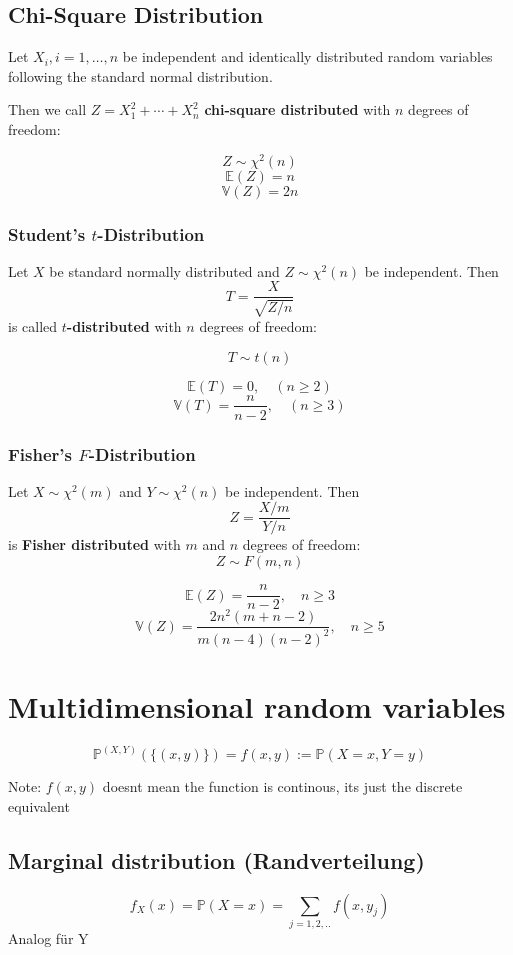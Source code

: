 \documentclass{article}
\begin{document}
\subsection{Chi-Square Distribution}
Let $X_i, i = 1,\ldots,n$ be independent and identically distributed random variables following the standard normal distribution.

Then we call $Z = X_1^2 + \cdots + X_n^2$ \textbf{chi-square distributed} with $n$ degrees of freedom:

\[Z \sim \chi^2(n)\]
\[\mathbb{E}(Z) = n\]
\[\mathbb{V}(Z) = 2n\]


\subsubsection{Student's $t$-Distribution}
Let $X$ be standard normally distributed and $Z \sim \chi^2(n)$ be independent. Then
\[T = \frac{X}{\sqrt{Z/n}}\] 
is called \textbf{$t$-distributed} with $n$ degrees of freedom:

\[T \sim t(n)\]

\[\mathbb{E}(T) = 0, \quad (n \geq 2)\]
\[\mathbb{V}(T) = \frac{n}{n-2}, \quad (n \geq 3)\]


\subsubsection{Fisher's $F$-Distribution}

Let $X \sim \chi^2(m)$ and $Y \sim \chi^2(n)$ be independent. Then
\[Z = \frac{X/m}{Y/n}\] 
is \textbf{Fisher distributed} with $m$ and $n$ degrees of freedom:
\[Z \sim F(m,n)\]

\[\mathbb{E}(Z) = \frac{n}{n-2}, \quad n \geq 3\]
\[\mathbb{V}(Z) = \frac{2n^2(m+n-2)}{m(n-4)(n-2)^2}, \quad n \geq 5\]

\section{Multidimensional random variables}

\[\mathbb{P}^{(X,Y)}(\{(x,y)\}) = f(x,y) := \mathbb{P}(X = x, Y = y)\]

Note: $f(x,y)$ doesnt mean the function is continous, its just the discrete equivalent
\subsection{Marginal distribution (Randverteilung)}

\[f_X(x) = \mathbb{P}(X = x) = \sum_{j=1,2,..}f(x,y_j)\]
Analog für Y
\end{document}
